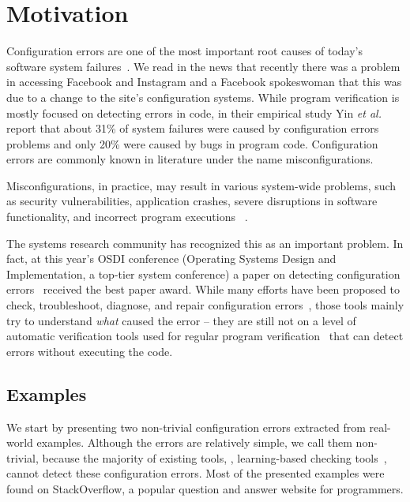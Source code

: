 \section{Motivation}
\label{sec:intro}

Configuration errors are one of the most important root causes of
today's software system failures~\cite{xu15systems, yin11anempirical}.
We read in the news that recently there was a problem in accessing  Facebook and Instagram \cite{mashableNews} and a Facebook spokeswoman that this was due to a change to the site's configuration systems.
While program verification is mostly focused on detecting errors 
in code, in their empirical study Yin {\em et al.}~\cite{yin11anempirical} report
that about 31\% of system failures were caused by configuration errors problems and only 20\% were caused by bugs in program code. Configuration 
errors are commonly known in literature under the name misconfigurations. 

Misconfigurations, in practice, may result in various
system-wide problems, such as security vulnerabilities, 
application crashes, severe disruptions in software
functionality, and incorrect program executions%
~\cite{zhang14encore, yuan11context, xu13do, xu15hey}. 

The systems research community has recognized this as an important
problem. In fact, at this year's OSDI conference (Operating Systems
Design and Implementation, a top-tier system conference) a paper on
detecting configuration errors~\cite{xu16early} received the best paper 
award. While many efforts have been proposed to check, troubleshoot, diagnose, and repair configuration errors~\cite{attariyan10automating,
su07autobash, whitaker04configuration},
those tools mainly try to understand {\emph{what}} caused the 
error -- they are still not on a level of
automatic verification tools used for regular program 
verification~\cite{Leino10Dafny, PiskacWZ14, BobotFMP15} that can
detect errors without executing the code.

\subsection{Examples}
\label{sec:intro-examples}

We start by presenting two non-trivial configuration errors
extracted from real-world examples. Although the errors are relatively simple, we call them 
non-trivial, because the majority of existing tools, \eg, learning-based checking
tools~\cite{zhang14encore, wang04automatic}, cannot detect
these configuration errors. Most of the presented examples were found on StackOverflow,
a popular question and answer website for programmers.

